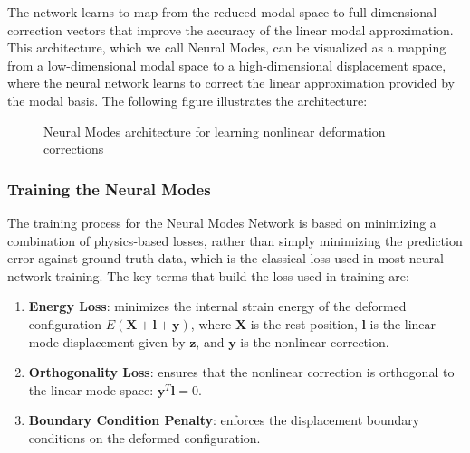 The network learns to map from the reduced modal space to full-dimensional correction vectors that improve the accuracy of the linear modal approximation. This architecture, which we call Neural Modes, can be visualized as a mapping from a low-dimensional modal space to a high-dimensional displacement space, where the neural network learns to correct the linear approximation provided by the modal basis. The following figure illustrates the architecture:
\begin{figure}[H] 
    \centering
    \caption{Neural Modes architecture for learning nonlinear deformation corrections}
    \label{fig:neural_modes_arch}
\end{figure}



\subsubsection{Training the Neural Modes}
The training process for the Neural Modes Network is based on minimizing a combination of physics-based losses, rather than simply minimizing the prediction error against ground truth data, which is the classical loss used in most neural network training. The key terms that build the loss used in training are:

\begin{enumerate}
    \item \textbf{Energy Loss}: minimizes the internal strain energy of the deformed configuration $E(\bm{X} + \bm{l} + \bm{y})$, where $\bm{X}$ is the rest position, $\bm{l}$ is the linear mode displacement given by $\bm{z}$, and $\bm{y}$ is the nonlinear correction.
    
    \item \textbf{Orthogonality Loss}: ensures that the nonlinear correction is orthogonal to the linear mode space: $\bm{y}^T \bm{l} = 0$.

    \item \textbf{Boundary Condition Penalty}: enforces the displacement boundary conditions on the deformed configuration.
    
\end{enumerate}

